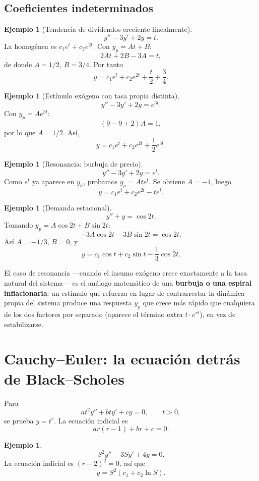 \documentclass[11pt]{article}
\theoremstyle{definition}
\newtheorem{ejemplo}[teorema]{Ejemplo}
\begin{document}
\subsection{Coeficientes indeterminados}
\begin{ejemplo}[Tendencia de dividendos creciente linealmente]
\[
y''-3y'+2y=t.
\]
La homogénea es $c_1e^t+c_2e^{2t}$. Con $y_p=At+B$:
\[
2At+2B-3A=t,
\]
de donde $A=1/2$, $B=3/4$. Por tanto
\[
\boxed{y=c_1e^t+c_2e^{2t}+\frac{t}{2}+\frac34}.
\]
\end{ejemplo}

\begin{ejemplo}[Estímulo exógeno con tasa propia distinta]
\[
y''-3y'+2y=e^{3t}.
\]
Con $y_p=Ae^{3t}$:
\[
(9-9+2)A=1,
\]
por lo que $A=1/2$. Así,
\[
\boxed{y=c_1e^t+c_2e^{2t}+\frac12e^{3t}}.
\]
\end{ejemplo}

\begin{ejemplo}[Resonancia: burbuja de precio]
\[
y''-3y'+2y=e^t.
\]
Como $e^t$ ya aparece en $y_h$, probamos $y_p=Ate^t$. Se obtiene $A=-1$, luego
\[
\boxed{y=c_1e^t+c_2e^{2t}-te^t}.
\]
\end{ejemplo}

\begin{ejemplo}[Demanda estacional]
\[
y''+y=\cos2t.
\]
Tomando $y_p=A\cos2t+B\sin2t$:
\[
-3A\cos2t-3B\sin2t=\cos2t.
\]
Así $A=-1/3$, $B=0$, y
\[
\boxed{y=c_1\cos t+c_2\sin t-\frac13\cos2t}.
\]
\end{ejemplo}

\begin{finanzas}
El caso de resonancia —cuando el insumo exógeno crece exactamente a la tasa natural
del sistema— es el análogo matemático de una \textbf{burbuja o una espiral
inflacionaria}: un estímulo que refuerza en lugar de contrarrestar la dinámica propia
del sistema produce una respuesta $y_p$ que crece más rápido que cualquiera de los dos
factores por separado (aparece el término extra $t\cdot e^{rt}$), en vez de estabilizarse.
\end{finanzas}

\section{Cauchy--Euler: la ecuación detrás de Black--Scholes}
Para
\[
at^2y''+bty'+cy=0,\qquad t>0,
\]
se prueba $y=t^r$. La ecuación indicial es
\[
ar(r-1)+br+c=0.
\]

\begin{ejemplo}
\[
S^2y''-3Sy'+4y=0.
\]
La ecuación indicial es $(r-2)^2=0$, así que
\[
\boxed{y=S^2(c_1+c_2\ln S)}.
\]
\end{ejemplo}
\end{document}
